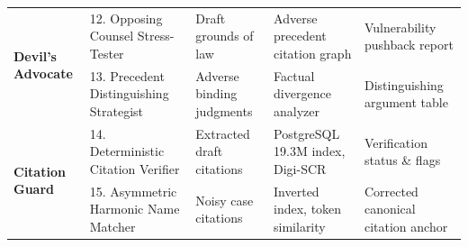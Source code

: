 \documentclass[conference]{IEEEtran}
\begin{document}
\begin{table}[t]
\begin{tabular}{lp{3.2cm}p{3.4cm}p{3.4cm}p{2.8cm}}
\midrule
\multirow{2}{*}{\textbf{Devil's Advocate}} & 12. Opposing Counsel Stress-Tester & Draft grounds of law & Adverse precedent citation graph & Vulnerability pushback report \\
 & 13. Precedent Distinguishing Strategist & Adverse binding judgments & Factual divergence analyzer & Distinguishing argument table \\
\midrule
\multirow{2}{*}{\textbf{Citation Guard}} & 14. Deterministic Citation Verifier & Extracted draft citations & PostgreSQL 19.3M index, Digi-SCR & Verification status \& flags \\
 & 15. Asymmetric Harmonic Name Matcher & Noisy case citations & Inverted index, token similarity & Corrected canonical citation anchor \\
\bottomrule
\end{tabular}
\end{table}
\end{document}
